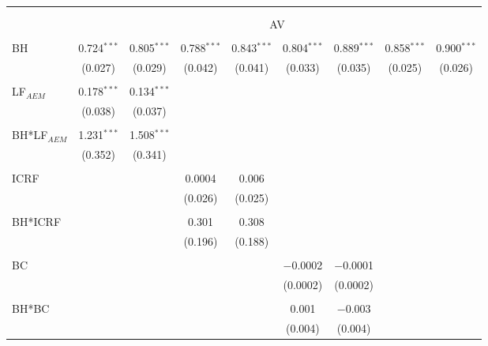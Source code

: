 
\begin{tabular}{@{\extracolsep{5pt}}lcccccccc} 
\\[-1.8ex]\hline 
\hline \\[-1.8ex] 
\\[-1.8ex] & \multicolumn{8}{c}{AV} \\ 
\hline \\[-1.8ex] 
 BH & 0.724$^{***}$ & 0.805$^{***}$ & 0.788$^{***}$ & 0.843$^{***}$ & 0.804$^{***}$ & 0.889$^{***}$ & 0.858$^{***}$ & 0.900$^{***}$ \\ 
  & (0.027) & (0.029) & (0.042) & (0.041) & (0.033) & (0.035) & (0.025) & (0.026) \\ 
  & & & & & & & & \\ 
 LF$_{AEM}$ & 0.178$^{***}$ & 0.134$^{***}$ &  &  &  &  &  &  \\ 
  & (0.038) & (0.037) &  &  &  &  &  &  \\ 
  & & & & & & & & \\ 
  BH*LF$_{AEM}$ & 1.231$^{***}$ & 1.508$^{***}$ &  &  &  &  &  &  \\ 
  & (0.352) & (0.341) &  &  &  &  &  &  \\ 
  & & & & & & & & \\ 
 ICRF &  &  & 0.0004 & 0.006 &  &  &  &  \\ 
  &  &  & (0.026) & (0.025) &  &  &  &  \\ 
  & & & & & & & & \\ 
   BH*ICRF &  &  & 0.301 & 0.308 &  &  &  &  \\ 
   &  &  & (0.196) & (0.188) &  &  &  &  \\ 
   & & & & & & & & \\ 
 BC &  &  &  &  & $-$0.0002 & $-$0.0001 &  &  \\ 
  &  &  &  &  & (0.0002) & (0.0002) &  &  \\ 
  & & & & & & & & \\ 
   BH*BC &  &  &  &  & 0.001 & $-$0.003 &  &  \\ 
   &  &  &  &  & (0.004) & (0.004) &  &  \\ 

\end{tabular}
